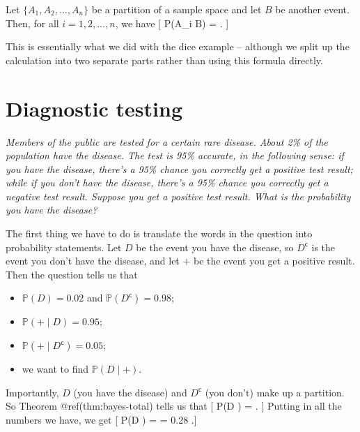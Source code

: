 \documentclass[
  letterpaper,
]{report}
\providecommand{\tightlist}{%
  \setlength{\itemsep}{0pt}\setlength{\parskip}{0pt}}\usepackage{longtable,booktabs,array}
\theoremstyle{definition}
\theoremstyle{definition}
\theoremstyle{remark}
\begin{document}
\leavevmode{}%
Let \(\{A_1, A_2, \dots, A_n\}\) be a partition of a sample space and
let \(B\) be another event. Then, for all \(i=1,2,\dots,n\), we have {[}
\mathbb P(A\_i \mid B) =
. {]}

This is essentially what we did with the dice example -- although we
split up the calculation into two separate parts rather than using this
formula directly.

\hypertarget{screening}{%
\section{Diagnostic testing}\label{screening}}

\emph{Members of the public are tested for a certain rare disease. About
2\% of the population have the disease. The test is 95\% accurate, in
the following sense: if you have the disease, there's a 95\% chance you
correctly get a positive test result; while if you don't have the
disease, there's a 95\% chance you correctly get a negative test result.
Suppose you get a positive test result. What is the probability you have
the disease?}

The first thing we have to do is translate the words in the question
into probability statements. Let \(D\) be the event you have the
disease, so \(D^\mathsf{c}\) is the event you don't have the disease,
and let \(+\) be the event you get a positive result. Then the question
tells us that

\begin{itemize}
\tightlist
\item
  \(\mathbb P(D) = 0.02\) and \(\mathbb P(D^\mathsf{c}) = 0.98\);
\item
  \(\mathbb P({+} \mid D) = 0.95\);
\item
  \(\mathbb P({+}\mid D^\mathsf{c}) = 0.05\);
\item
  we want to find \(\mathbb P(D \mid {+})\).
\end{itemize}

Importantly, \(D\) (you have the disease) and \(D^\mathsf{c}\) (you
don't) make up a partition. So Theorem @ref(thm:bayes-total) tells us
that {[} \mathbb P(D \mid {+}) =
. {]} Putting in all the numbers we have, we get {[} \mathbb P(D
\mid {+}) = 
= 0.28 .{]}
\end{document}
